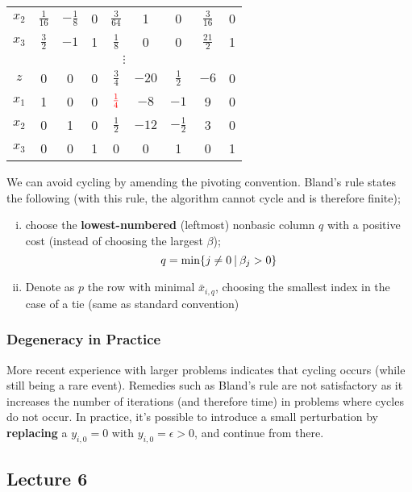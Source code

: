 \documentclass[a4paper, 12pt]{article}
\newcommand{\red}[1]{\textcolor{red}{#1}}
\begin{document}
\begin{center}
\begin{tabular}{c|ccccccc|c}
                        $x_2$ & $\frac{1}{16}$ & $-\frac{1}{8}$ & 0 & $\frac{3}{64}$ & 1 & 0 & $\frac{3}{16}$ & 0 \\
                        $x_3$ & $\frac{3}{2}$ & $-1$ & 1 & $\frac{1}{8}$ & 0 & 0 & $\frac{21}{2}$ & 1 \\
                        \hline
                        \multicolumn{9}{c}{$\vdots$} \\
                        \hline
                        $z$ & 0 & 0 & 0 & $\frac{3}{4}$ & $-20$ & $\frac{1}{2}$ & $-6$ & 0 \\
                        $x_1$ & 1 & 0 & 0 & $\red{\frac{1}{4}}$ & $-8$ & $-1$ & 9 & 0 \\
                        $x_2$ & 0 & 1 & 0 & $\frac{1}{2}$ & $-12$ & $-\frac{1}{2}$ & 3 & 0 \\
                        $x_3$ & 0 & 0 & 1 & 0 & 0 & 1 & 0 & 1
                    \end{tabular}
                \end{center}
                We can avoid cycling by amending the pivoting convention.
                Bland's rule states the following (with this rule, the algorithm cannot cycle and is therefore finite);
                \begin{enumerate}[(i)]
                    \itemsep0em
                    \item choose the \textbf{lowest-numbered} (leftmost) nonbasic column $q$ with a positive cost (instead of choosing the largest $\beta$);
                        $$q = \min \{ j \neq 0\ \vline\ \beta_j > 0 \}$$
                    \item Denote as $p$ the row with minimal $\bar{x}_{i, q}$, choosing the smallest index in the case of a tie (same as standard convention)
                \end{enumerate}
            \subsubsection*{Degeneracy in Practice}
                More recent experience with larger problems indicates that cycling occurs (while still being a rare event).
                Remedies such as Bland's rule are not satisfactory as it increases the number of iterations (and therefore time) in problems where cycles do not occur.
                In practice, it's possible to introduce a small perturbation by \textbf{replacing} a $y_{i, 0} = 0$ with $y_{i, 0} = \epsilon > 0$, and continue from there.
        \subsection*{Lecture 6}
\end{document}
